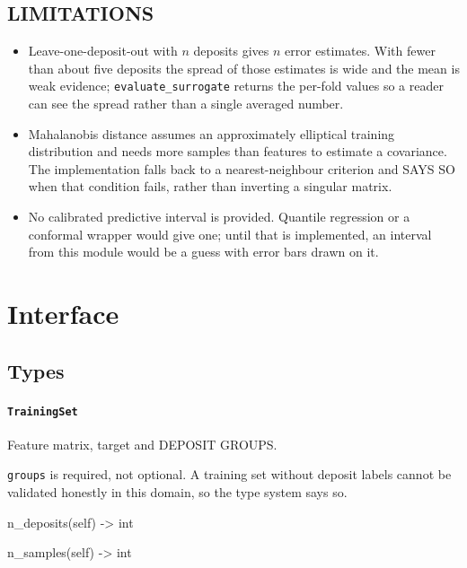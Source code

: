 \documentclass[10pt,a4paper,twoside]{report}
\begin{document}
\subsection*{LIMITATIONS}

\begin{itemize}
\item Leave-one-deposit-out with $n$ deposits gives $n$ error estimates. With fewer than about five deposits the spread of those estimates is wide and the mean is weak evidence; \texttt{evaluate\_surrogate} returns the per-fold values so a reader can see the spread rather than a single averaged number.
\item Mahalanobis distance assumes an approximately elliptical training distribution and needs more samples than features to estimate a covariance. The implementation falls back to a nearest-neighbour criterion and SAYS SO when that condition fails, rather than inverting a singular matrix.
\item No calibrated predictive interval is provided. Quantile regression or a conformal wrapper would give one; until that is implemented, an interval from this module would be a guess with error bars drawn on it.
\end{itemize}

\section{Interface}

\subsection*{Types}

\paragraph{\texttt{TrainingSet}}

Feature matrix, target and DEPOSIT GROUPS.

\texttt{groups} is required, not optional. A training set without deposit labels cannot be validated honestly in this domain, so the type system says so.

\begin{verbatimsmall}
n_deposits(self) -> int
\end{verbatimsmall}

\begin{verbatimsmall}
n_samples(self) -> int
\end{verbatimsmall}
\end{document}
